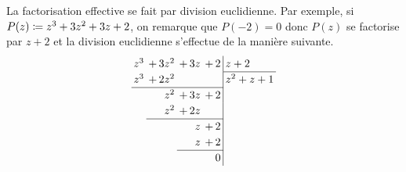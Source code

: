 \documentclass{magnoliaold}
\begin{document}
  \begin{remarques}
  \remarque La factorisation
  effective se fait par division euclidienne. Par exemple, si $P(z)\coloneqq z^3+3z^2+3z+2$, on
  remarque que $P(-2)=0$ donc $P(z)$ se factorise par $z+2$ et la division euclidienne s'effectue de la manière
  suivante.
  \begin{equation*}
  \renewcommand{\arraystretch}{1.2}
  \renewcommand{\arraycolsep}{2pt}
  \begin{array}{rrrr|l}
  z^3 & +\,3z^2 & +\,3z & +\,2 & z + 2 \\
  \cline{5-5}
  z^3 & +\,2z^2 &   &  & z^2+z+1 \\
  \cline{1-4}
      & z^2 &  +\,3z & +\,2 &     \\
      & z^2 & +\,2z &  &   \\
      \cline{2-4}
      &     & z & +\,2 &   \\
      &     & z & +\,2 &    \\
                \cline{3-4}
      &     &   &0&   
  \end{array}
  \end{equation*}
  

\end{remarques}
\end{document}
